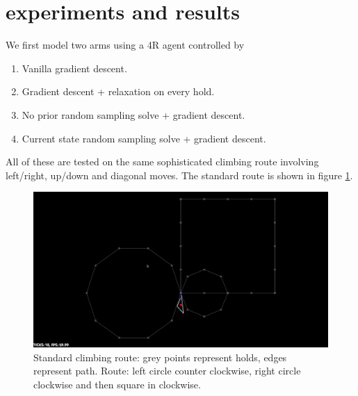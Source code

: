 \documentclass[12pt]{article}
\begin{document}
\section{experiments and results}
We first model two arms using a 4R agent controlled by
\begin{enumerate}[nolistsep]
    \item Vanilla gradient descent.
    \item Gradient descent + relaxation on every hold.
    \item No prior random sampling solve + gradient descent.
    \item Current state random sampling solve + gradient descent.
\end{enumerate}
All of these are tested on the same sophisticated climbing route involving left/right, up/down and diagonal moves.
The standard route is shown in figure \ref{fig:route}.

\begin{figure}[!htb]
\includegraphics[width=\linewidth]{figures/route.jpg}
\endminipage\hfill
\caption{Standard climbing route: grey points represent holds, edges represent path. Route: left circle counter clockwise, right circle clockwise and then square in clockwise.}
\label{fig:route}
\end{figure}
\end{document}
